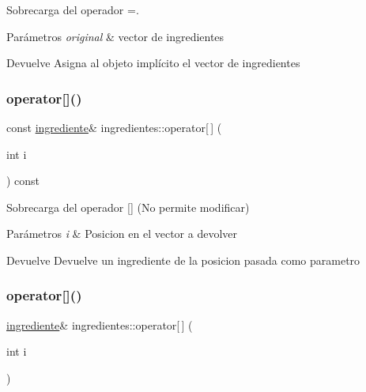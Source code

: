 Sobrecarga del operador =. 


\begin{DoxyParams}{Parámetros}
{\em original} & vector de ingredientes \\
\hline
\end{DoxyParams}
\begin{DoxyReturn}{Devuelve}
Asigna al objeto implícito el vector de ingredientes 
\end{DoxyReturn}
\mbox{\label{classingredientes_a4d26f4035049ca7fb9506df48895cc4f}} 
\subsubsection{\texorpdfstring{operator[]()}{operator[]()}\hspace{0.1cm}{\footnotesize\ttfamily [1/2]}}
{\footnotesize\ttfamily const \hyperlink{classingrediente}{ingrediente}\& ingredientes\+::operator\mbox{[}$\,$\mbox{]} (\begin{DoxyParamCaption}\item[{int}]{i }\end{DoxyParamCaption}) const}



Sobrecarga del operador \mbox{[}\mbox{]} (No permite modificar) 


\begin{DoxyParams}{Parámetros}
{\em i} & Posicion en el vector a devolver \\
\hline
\end{DoxyParams}
\begin{DoxyReturn}{Devuelve}
Devuelve un ingrediente de la posicion pasada como parametro 
\end{DoxyReturn}
\mbox{\label{classingredientes_a9e099786f83d0ac3cf38317b194691db}} 
\subsubsection{\texorpdfstring{operator[]()}{operator[]()}\hspace{0.1cm}{\footnotesize\ttfamily [2/2]}}
{\footnotesize\ttfamily \hyperlink{classingrediente}{ingrediente}\& ingredientes\+::operator\mbox{[}$\,$\mbox{]} (\begin{DoxyParamCaption}\item[{int}]{i }\end{DoxyParamCaption})}



